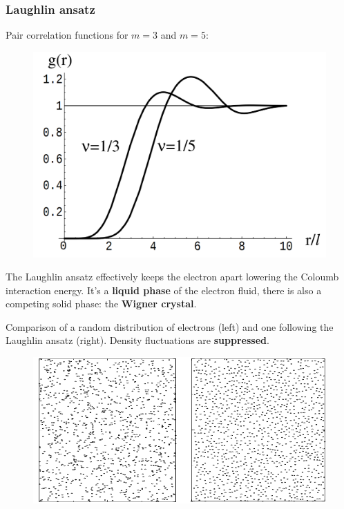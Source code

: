 \documentclass{beamer}
\begin{document}
\begin{frame}
\frametitle{Laughlin ansatz}
\begin{center}

Pair correlation functions for $m = 3$ and $m=5$:

\begin{figure}[!htb]
\centering
\includegraphics[scale=0.2]{gfunction.png}
\end{figure}


The Laughlin ansatz effectively keeps the electron apart lowering the Coloumb interaction energy. It's a \textbf{liquid phase} of the electron fluid, there is also a competing solid phase: the \textbf{Wigner crystal}.

\end{center}
\end{frame}

\begin{frame}
\begin{center}

Comparison of a random distribution of electrons (left) and one following the Laughlin ansatz (right). Density fluctuations are \textbf{suppressed}.

\begin{figure}[!htb]
\centering
\includegraphics[scale=0.4]{comparison.png}
\end{figure}

\end{center}
\end{frame}
\end{document}
